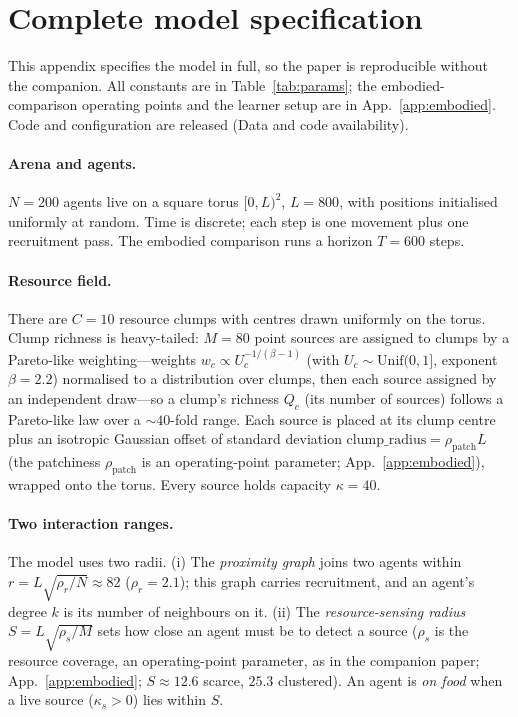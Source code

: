 \documentclass{article}
\begin{document}



\appendix
\section{Complete model specification}
\label{app:modelspec}
This appendix specifies the model in full, so the paper is reproducible without the companion. All constants
are in Table~\ref{tab:params}; the embodied-comparison operating points and the learner setup are in
App.~\ref{app:embodied}. Code and configuration are released (Data and code availability).

\paragraph{Arena and agents.} $N{=}200$ agents live on a square torus $[0,L)^2$, $L{=}800$, with positions
initialised uniformly at random. Time is discrete; each step is one movement plus one recruitment pass. The
embodied comparison runs a horizon $T{=}600$ steps.

\paragraph{Resource field.} There are $C{=}10$ resource clumps with centres drawn uniformly on the torus. Clump
richness is heavy-tailed: $M{=}80$ point sources are assigned to clumps by a Pareto-like weighting---weights
$w_c\propto U_c^{-1/(\beta-1)}$ (with $U_c\sim\mathrm{Unif}(0,1]$, exponent $\beta{=}2.2$) normalised to a
distribution over clumps, then each source assigned by an independent draw---so a clump's richness $Q_c$ (its
number of sources) follows a Pareto-like law over a ${\sim}40$-fold range. Each source is placed at its clump
centre plus an isotropic Gaussian offset of standard deviation $\mathrm{clump\_radius}=\rho_{\mathrm{patch}}L$
(the patchiness $\rho_{\mathrm{patch}}$ is an operating-point parameter; App.~\ref{app:embodied}), wrapped onto
the torus. Every source holds capacity $\kappa{=}40$.

\paragraph{Two interaction ranges.} The model uses two radii. (i) The \emph{proximity graph} joins two agents
within $r=L\sqrt{\rho_r/N}\approx82$ ($\rho_r{=}2.1$); this graph carries recruitment, and an agent's degree
$k$ is its number of neighbours on it. (ii) The \emph{resource-sensing radius} $S=L\sqrt{\rho_s/M}$
sets how close an agent must be to detect a source ($\rho_s$ is the resource coverage, an
operating-point parameter, as in the companion paper; App.~\ref{app:embodied}; $S\approx12.6$ scarce,
$25.3$ clustered). An agent is \emph{on food} when a live source ($\kappa_s>0$) lies
within $S$.
\end{document}
